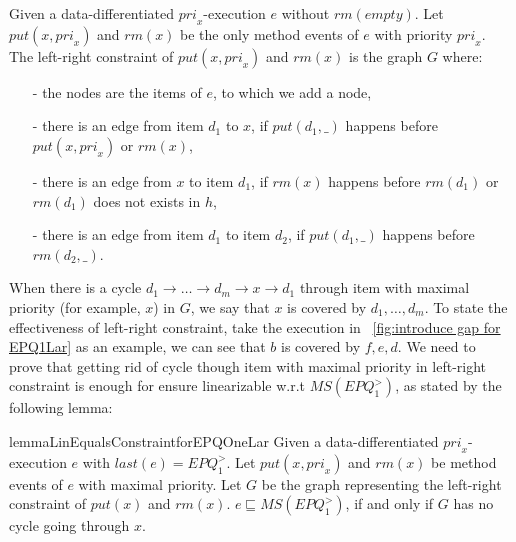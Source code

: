 \begin{definition}\label{def:left-right constraint for matched put and rm operations}
Given a data-differentiated $\textit{pri}_x$-execution $e$ without $\textit{rm}(\textit{empty})$. Let $\textit{put}(x,\textit{pri}_x)$ and $\textit{rm}(x)$ be the only  method events of $e$ with priority $\textit{pri}_x$. The left-right constraint of $\textit{put}(x,\textit{pri}_x)$ and $\textit{rm}(x)$ is the graph $G$ where:

\begin{itemize}
\setlength{\itemsep}{0.5pt}
\item[-] the nodes are the items of $e$, to which we add a node,

\item[-] there is an edge from item $d_1$ to $x$, if $\textit{put}(d_1,\_)$ happens before $\textit{put}(x,\textit{pri}_x)$ or $\textit{rm}(x)$,

\item[-] there is an edge from $x$ to item $d_1$, if $\textit{rm}(x)$ happens before $\textit{rm}(d_1)$ or $\textit{rm}(d_1)$ does not exists in $h$,

\item[-] there is an edge from item $d_1$ to item $d_2$, if $\textit{put}(d_1,\_)$ happens before $\textit{rm}(d_2,\_)$.
\end{itemize}
\end{definition}

When there is a cycle $d_1 \rightarrow \ldots \rightarrow d_m \rightarrow x \rightarrow d_1$ through item with maximal priority (for example, $x$) in $G$, we say that $x$ is covered by $d_1,\ldots,d_m$. To state the effectiveness of left-right constraint, take the execution in \figurename~\ref{fig:introduce gap for EPQ1Lar} as an example, we can see that $b$ is covered by $f,e,d$. We need to prove that getting rid of cycle though item with maximal priority in left-right constraint is enough for ensure linearizable w.r.t $\textit{MS}(\textit{EPQ}_1^{>})$, as stated by the following lemma:

\begin{restatable}{lemma}{LinEqualsConstraintforEPQOneLar}
\label{lemma:Lin Equals Constraint for EPQ1Lar}
Given a data-differentiated $\textit{pri}_x$-execution $e$ with $\textit{last}(e) = \textit{EPQ}_1^{>}$. Let $\textit{put}(x,\textit{pri}_x)$ and $\textit{rm}(x)$ be method events of $e$ with maximal priority. Let $G$ be the graph representing the left-right constraint of $\textit{put}(x)$ and $\textit{rm}(x)$. $e \sqsubseteq \textit{MS}(\textit{EPQ}_1^{>})$, if and only if $G$ has no cycle going through $x$.
\end{restatable}

